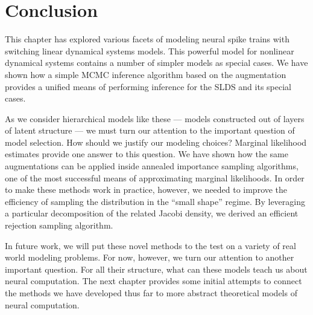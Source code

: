 \section{Conclusion}
This chapter has explored various facets of modeling neural spike
trains with switching linear dynamical systems models. This powerful
model for nonlinear dynamical systems contains a number of simpler
models as special cases. We have shown how a simple MCMC inference
algorithm based on the \polyagamma augmentation provides a unified
means of performing inference for the SLDS and its special cases.

As we consider hierarchical models like these --- models constructed out of
layers of latent structure --- we must turn our attention to the
important question of model selection. How should we justify our
modeling choices? Marginal likelihood estimates provide one answer
to this question. We have shown how the same \polyagamma augmentations
can be applied inside annealed importance sampling algorithms,
one of the most successful means of approximating marginal likelihoods.
In order to make these methods work in practice, however, we needed to
improve the efficiency of sampling the \polyagamma distribution in the
``small shape'' regime. By leveraging a particular decomposition of the
related Jacobi density, we derived an efficient rejection sampling algorithm.

In future work, we will put these novel methods to the test on a variety
of real world modeling problems. For now, however, we turn our attention
to another important question. For all their structure, what can these
models teach us about neural computation. The next chapter provides some
initial attempts to connect the methods we have developed thus far to more
abstract theoretical models of neural computation. 

